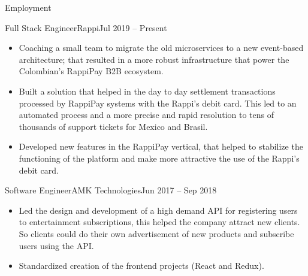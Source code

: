 \documentclass[calibri]{../macdowell-cv/mcdowellcv}
\begin{document}
	\begin{cvsection}{Employment}
		\begin{cvsubsection}{Full Stack Engineer}{Rappi}{Jul 2019 -- Present}
			\begin{itemize}
				\item Coaching a small team to migrate the old microservices to a new event-based architecture; that resulted in a more robust infrastructure that power the Colombian's RappiPay B2B ecosystem.
			\end{itemize}
			\begin{itemize}
				\item Built a solution that helped in the day to day settlement transactions processed by RappiPay systems with the Rappi's debit card. This led to an automated process and a more precise and rapid resolution to tens of thousands of support tickets for Mexico and Brasil.
			\end{itemize}
			\begin{itemize}
				\item Developed new features in the RappiPay vertical, that helped to stabilize the functioning of the platform and make more attractive the use of the Rappi's debit card.
			\end{itemize}
		\end{cvsubsection}

		\begin{cvsubsection}{Software Engineer}{AMK Technologies}{Jun 2017 -- Sep 2018}
			\begin{itemize}
				\item Led the design and development of a high demand API for registering users to entertainment subscriptions, this helped the company attract new clients. So clients could do their own advertisement of new products and subscribe users using the API.
			\end{itemize}
			\begin{itemize}
				\item Standardized creation of the frontend projects (React and Redux).
			\end{itemize}
		\end{cvsubsection}


\end{cvsection}
\end{document}
